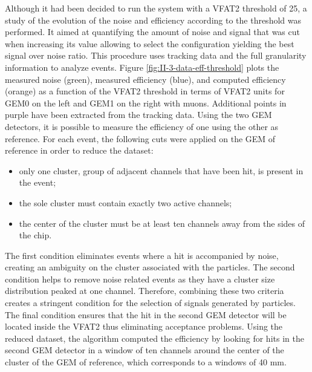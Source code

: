       Although it had been decided to run the system with a VFAT2 threshold of 25, a study of the evolution of the noise and efficiency according to the threshold was performed. It aimed at quantifying the amount of noise and signal that was cut when increasing its value allowing to select the configuration yielding the best signal over noise ratio. This procedure uses tracking data and the full granularity information to analyze events. Figure \ref{fig:II-3-data-eff-threshold} plots the measured noise (green), measured efficiency (blue), and computed efficiency (orange) as a function of the VFAT2 threshold in terms of VFAT2 units for GEM0 on the left and GEM1 on the right with muons. Additional points in purple have been extracted from the tracking data. Using the two GEM detectors, it is possible to measure the efficiency of one using the other as reference. For each event, the following cuts were applied on the GEM of reference in order to reduce the dataset:
      \begin{itemize}
        \item only one cluster, group of adjacent channels that have been hit, is present in the event;
        \item the sole cluster must contain exactly two active channels;
        \item the center of the cluster must be at least ten channels away from the sides of the chip.
      \end{itemize}
      The first condition eliminates events where a hit is accompanied by noise, creating an ambiguity on the cluster associated with the particles. The second condition helps to remove noise related events as they have a cluster size distribution peaked at one channel. Therefore, combining these two criteria creates a stringent condition for the selection of signals generated by particles. The final condition ensures that the hit in the second GEM detector will be located inside the VFAT2 thus eliminating acceptance problems. Using the reduced dataset, the algorithm computed the efficiency by looking for hits in the second GEM detector in a window of ten channels around the center of the cluster of the GEM of reference, which corresponds to a windows of 40 mm. \\

